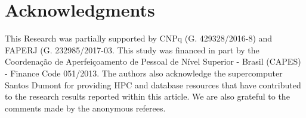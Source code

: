 \section*{Acknowledgments}
\label{ack}

This Research was partially supported by CNPq (G. 429328/2016-8) and FAPERJ (G. 232985/2017-03. This study was financed in part by the Coordenação de Aperfeiçoamento de Pessoal de Nível Superior - Brasil (CAPES) - Finance Code 051/2013. The authors also acknowledge the supercomputer Santos Dumont for providing HPC and database resources that have contributed to the research results reported within this article. We are also grateful to the comments made by the anonymous referees.